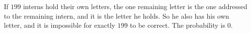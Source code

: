 If $199$ interns hold their own letters, the one remaining letter is the one addressed to the remaining intern, and it is the letter he holds. So he also has his own letter, and it is impossible for exactly $199$ to be correct. The probability is $\boxed{0}$.
